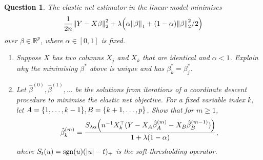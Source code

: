 \documentclass{article}
\theoremstyle{plain}
\newtheorem{question}{Question}
\theoremstyle{remark}
\newcommand{\Bb}{\mathbb}
\newcommand{\RR}{\Bb R}
\newcommand{\T}{^\top} %
\DeclareMathOperator{\sign}{sgn}
\begin{document}
\begin{question}
	The elastic net estimator in the linear model minimises
	\[
	\frac1{2n} \norm{Y - X\beta}_2^2 + \lambda \qty(\alpha \norm{\beta}_1 + (1-\alpha) \norm{\beta}_2^2/2)
	\]
	over $\beta \in \RR^p$, where $\alpha \in [0, 1]$ is fixed. 
	\begin{enumerate}
		\item 	Suppose $X$ has two columns $X_j$ and $X_k$ that are identical and $\alpha < 1$. Explain why the minimising $\beta^*$ above is unique and has $\beta_k^* = \beta_j^*$. 
		\item Let $\hat\beta^{(0)}, \hat\beta^{(1)}, \dotsc$ be the solutions from iterations of a coordinate descent procedure to minimise the elastic net objective. For a fixed variable index $k$, let $A = \qty{1, \dotsc, k-1}, B = \qty{k+1,\dotsc, p}$. Show that for $m \geq 1$,
		\[
		\hat\beta_k^{(m)} = \frac{S_{\lambda\alpha} \qty(n^{-1} X_k\T (Y - X_A \hat\beta_A^{(m)} - X_B \hat\beta_B^{(m-1)}))}{1 + \lambda(1-\alpha)},
		\] 
		where $S_t(u) = \sign(u) (\abs{u} - t)_+$ is the soft-thresholding operator.
	\end{enumerate}

\end{question}
\end{document}

